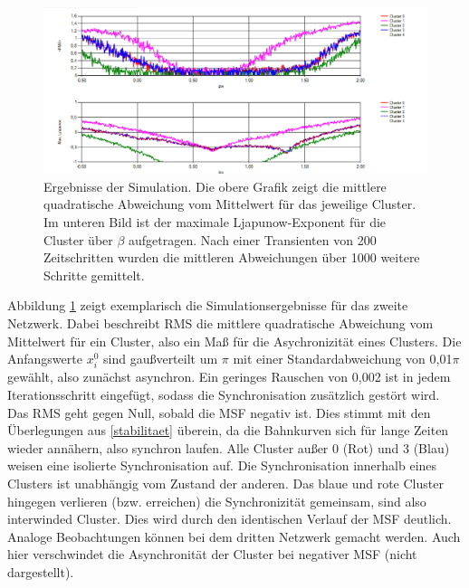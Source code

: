 \begin{figure}
	\centering
	\includegraphics[width=1.0\textwidth]{abb/misc/ljapResult.png}
	\caption{Ergebnisse der Simulation. Die obere Grafik zeigt die mittlere quadratische Abweichung vom Mittelwert für das jeweilige Cluster. Im unteren Bild ist der maximale Ljapunow-Exponent für die Cluster über $\beta$ aufgetragen. Nach einer Transienten von 200 Zeitschritten wurden die mittleren Abweichungen über 1000 weitere Schritte gemittelt.}
	\label{fig:ljapResult}
\end{figure}

Abbildung \ref{fig:ljapResult} zeigt exemplarisch die Simulationsergebnisse für das zweite Netzwerk. Dabei beschreibt RMS die mittlere quadratische Abweichung vom Mittelwert für ein Cluster, also ein Maß für die Asychronizität eines Clusters. Die Anfangswerte $x_i^0$ sind gaußverteilt um $\pi$ mit einer Standardabweichung von 0,01$\pi$ gewählt, also zunächst asynchron. Ein geringes Rauschen von 0,002 ist in jedem Iterationsschritt eingefügt, sodass die Synchronisation zusätzlich gestört wird.
Das RMS geht gegen Null, sobald die MSF negativ ist. Dies stimmt mit den Überlegungen aus \ref{stabilitaet} überein, da die Bahnkurven sich für lange Zeiten wieder annähern, also synchron laufen.
Alle Cluster außer 0 (Rot) und 3 (Blau) weisen eine isolierte Synchronisation auf. Die Synchronisation innerhalb eines Clusters ist unabhängig vom Zustand der anderen. Das blaue und rote Cluster hingegen verlieren (bzw. erreichen) die Synchronizität gemeinsam, sind also interwinded Cluster. Dies wird durch den identischen Verlauf der MSF deutlich.
Analoge Beobachtungen können bei dem dritten Netzwerk gemacht werden. Auch hier verschwindet die Asynchronität der Cluster bei negativer MSF (nicht dargestellt).

